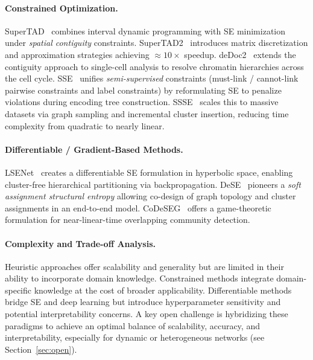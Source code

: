 \paragraph{Constrained Optimization.}
SuperTAD~\cite{zhang2021supertad} combines interval dynamic programming with
SE minimization under \emph{spatial contiguity} constraints.
SuperTAD2~\cite{ling2024supertad2} introduces matrix discretization and
approximation strategies achieving ${\approx}10\times$ speedup.
deDoc2~\cite{li2023dedoc2} extends the contiguity approach to single-cell
analysis to resolve chromatin hierarchies across the cell cycle.
SSE~\cite{zeng2024semiSSE} unifies \emph{semi-supervised} constraints
(must-link / cannot-link pairwise constraints and label constraints) by
reformulating SE to penalize violations during encoding tree construction.
SSSE~\cite{zeng2024scalableSSSE} scales this to massive datasets via graph
sampling and incremental cluster insertion, reducing time complexity from
quadratic to nearly linear.

\paragraph{Differentiable / Gradient-Based Methods.}
LSENet~\cite{sun2024lsenet} creates a differentiable SE formulation in
hyperbolic space, enabling cluster-free hierarchical partitioning via
backpropagation.
DeSE~\cite{zhang2025dese} pioneers a \emph{soft assignment structural entropy}
allowing co-design of graph topology and cluster assignments in an
end-to-end model.
CoDeSEG~\cite{xian2025communitySEGame} offers a game-theoretic formulation
for near-linear-time overlapping community detection.

\paragraph{Complexity and Trade-off Analysis.}
Heuristic approaches offer scalability and generality but are limited in their
ability to incorporate domain knowledge.
Constrained methods integrate domain-specific knowledge at the cost of
broader applicability.
Differentiable methods bridge SE and deep learning but introduce
hyperparameter sensitivity and potential interpretability concerns.
A key open challenge is hybridizing these paradigms to achieve an optimal
balance of scalability, accuracy, and interpretability, especially for dynamic
or heterogeneous networks (see Section~\ref{sec:open}).

